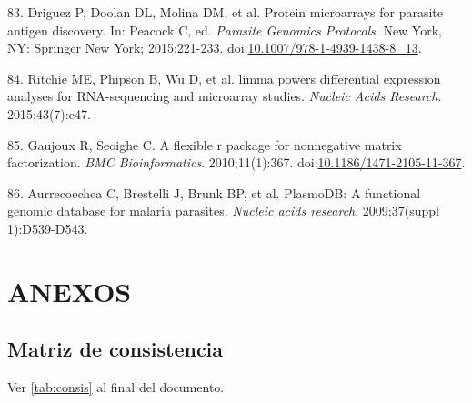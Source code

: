 \documentclass[]{article}
\begin{document}
\hypertarget{ref-Driguez2015}{}
83. Driguez P, Doolan DL, Molina DM, et al. Protein microarrays for
parasite antigen discovery. In: Peacock C, ed. \emph{Parasite Genomics
Protocols}. New York, NY: Springer New York; 2015:221-233.
doi:\href{https://doi.org/10.1007/978-1-4939-1438-8_13}{10.1007/978-1-4939-1438-8\_13}.

\hypertarget{ref-limma}{}
84. Ritchie ME, Phipson B, Wu D, et al. limma powers differential
expression analyses for RNA-sequencing and microarray studies.
\emph{Nucleic Acids Research}. 2015;43(7):e47.

\hypertarget{ref-Gaujoux2010NMF}{}
85. Gaujoux R, Seoighe C. A flexible r package for nonnegative matrix
factorization. \emph{BMC Bioinformatics}. 2010;11(1):367.
doi:\href{https://doi.org/10.1186/1471-2105-11-367}{10.1186/1471-2105-11-367}.

\hypertarget{ref-plasmodb}{}
86. Aurrecoechea C, Brestelli J, Brunk BP, et al. PlasmoDB: A functional
genomic database for malaria parasites. \emph{Nucleic acids research}.
2009;37(suppl 1):D539-D543.

\section{ANEXOS}\label{anexos}

\subsection{Matriz de consistencia}\label{matriz-de-consistencia}

Ver \autoref{tab:consis} al final del documento.
\end{document}

